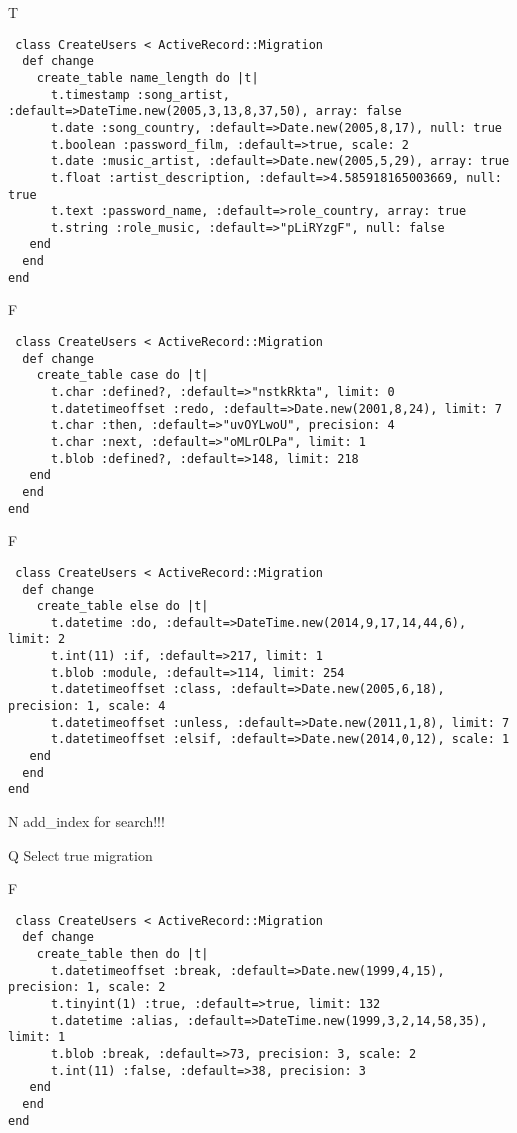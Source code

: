 T
\begin{verbatim}
 class CreateUsers < ActiveRecord::Migration 
  def change 
    create_table name_length do |t| 
      t.timestamp :song_artist, :default=>DateTime.new(2005,3,13,8,37,50), array: false
      t.date :song_country, :default=>Date.new(2005,8,17), null: true
      t.boolean :password_film, :default=>true, scale: 2
      t.date :music_artist, :default=>Date.new(2005,5,29), array: true
      t.float :artist_description, :default=>4.585918165003669, null: true
      t.text :password_name, :default=>role_country, array: true
      t.string :role_music, :default=>"pLiRYzgF", null: false
   end 
  end 
end
\end{verbatim}

F
\begin{verbatim}
 class CreateUsers < ActiveRecord::Migration 
  def change 
    create_table case do |t| 
      t.char :defined?, :default=>"nstkRkta", limit: 0
      t.datetimeoffset :redo, :default=>Date.new(2001,8,24), limit: 7
      t.char :then, :default=>"uvOYLwoU", precision: 4
      t.char :next, :default=>"oMLrOLPa", limit: 1
      t.blob :defined?, :default=>148, limit: 218
   end 
  end 
end
\end{verbatim}

F
\begin{verbatim}
 class CreateUsers < ActiveRecord::Migration 
  def change 
    create_table else do |t| 
      t.datetime :do, :default=>DateTime.new(2014,9,17,14,44,6), limit: 2
      t.int(11) :if, :default=>217, limit: 1
      t.blob :module, :default=>114, limit: 254
      t.datetimeoffset :class, :default=>Date.new(2005,6,18), precision: 1, scale: 4
      t.datetimeoffset :unless, :default=>Date.new(2011,1,8), limit: 7
      t.datetimeoffset :elsif, :default=>Date.new(2014,0,12), scale: 1
   end 
  end 
end
\end{verbatim}
N
add_index for search!!!
  
Q
Select true migration

F
\begin{verbatim}
 class CreateUsers < ActiveRecord::Migration 
  def change 
    create_table then do |t| 
      t.datetimeoffset :break, :default=>Date.new(1999,4,15), precision: 1, scale: 2
      t.tinyint(1) :true, :default=>true, limit: 132
      t.datetime :alias, :default=>DateTime.new(1999,3,2,14,58,35), limit: 1
      t.blob :break, :default=>73, precision: 3, scale: 2
      t.int(11) :false, :default=>38, precision: 3
   end 
  end 
end
\end{verbatim}

